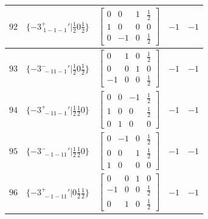 \documentclass[fleqn,8pt]{jsarticle}
\begin{document}
\begin{longtable}{ccccc}
$ 92 $ & $ \{-3^{+}_{\,\,1-1-1}{}'|\frac{1}{2} 0 \frac{1}{2}\} $ & $ \begin{bmatrix} 0 & 0 & 1 & \frac{1}{2} \\ 1 & 0 & 0 & 0 \\ 0 & -1 & 0 & \frac{1}{2} \end{bmatrix} $ & $ -1 $ & $ -1 $ \\ \hline
$ 93 $ & $ \{-3^{-}_{\,\,-11-1}{}'|\frac{1}{2} 0 \frac{1}{2}\} $ & $ \begin{bmatrix} 0 & 1 & 0 & \frac{1}{2} \\ 0 & 0 & 1 & 0 \\ -1 & 0 & 0 & \frac{1}{2} \end{bmatrix} $ & $ -1 $ & $ -1 $ \\ \hline
$ 94 $ & $ \{-3^{+}_{\,\,-11-1}{}'|\frac{1}{2} \frac{1}{2} 0\} $ & $ \begin{bmatrix} 0 & 0 & -1 & \frac{1}{2} \\ 1 & 0 & 0 & \frac{1}{2} \\ 0 & 1 & 0 & 0 \end{bmatrix} $ & $ -1 $ & $ -1 $ \\ \hline
$ 95 $ & $ \{-3^{-}_{\,\,-1-11}{}'|\frac{1}{2} \frac{1}{2} 0\} $ & $ \begin{bmatrix} 0 & -1 & 0 & \frac{1}{2} \\ 0 & 0 & 1 & \frac{1}{2} \\ 1 & 0 & 0 & 0 \end{bmatrix} $ & $ -1 $ & $ -1 $ \\ \hline
$ 96 $ & $ \{-3^{+}_{\,\,-1-11}{}'|0 \frac{1}{2} \frac{1}{2}\} $ & $ \begin{bmatrix} 0 & 0 & 1 & 0 \\ -1 & 0 & 0 & \frac{1}{2} \\ 0 & 1 & 0 & \frac{1}{2} \end{bmatrix} $ & $ -1 $ & $ -1 $ \\
\end{longtable}
\end{document}
